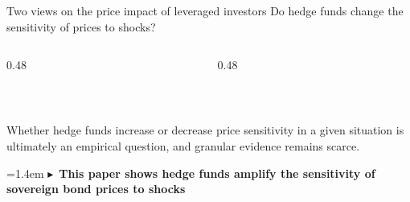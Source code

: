 \documentclass[aspectratio=169,10pt]{beamer}
\def\hird{\textcolor{accentred}}
\def\higr{\textcolor{accentgreen}}
\newcommand{\lvs}{\vspace{0.32cm}}
\newcommand{\svs}{\vspace{0.18cm}}
\newcommand{\takeaway}[1]{%
  \par\smallskip\noindent
  \hangindent=1.4em\hangafter=1
  \textcolor{goetheblue}{$\blacktriangleright$}\ {\color{goetheblue}\bfseries #1}\par}
\begin{document}
\begin{frame}{Two views on the price impact of leveraged investors}
\lvs
Do hedge funds change the sensitivity of prices to shocks?
\svs
\begin{columns}[t]
\begin{column}{0.48\textwidth}
  \begin{center}
  \\[3pt]
  {\scriptsize\color{softgrey}\citet{gromb2002, cao2018}}
  \end{center}
\end{column}
\begin{column}{0.48\textwidth}
  \begin{center}
  \\[3pt]
  {\scriptsize\color{softgrey}\citet{shleifer1997, brunnermeier2009, geanakoplos2010}}
  \end{center}
\end{column}
\end{columns}
\lvs
Whether hedge funds increase or decrease price sensitivity in a given situation is ultimately an empirical question, and granular evidence remains scarce.
\takeaway{This paper shows hedge funds amplify the sensitivity of sovereign bond prices to shocks}
\end{frame}
\end{document}
